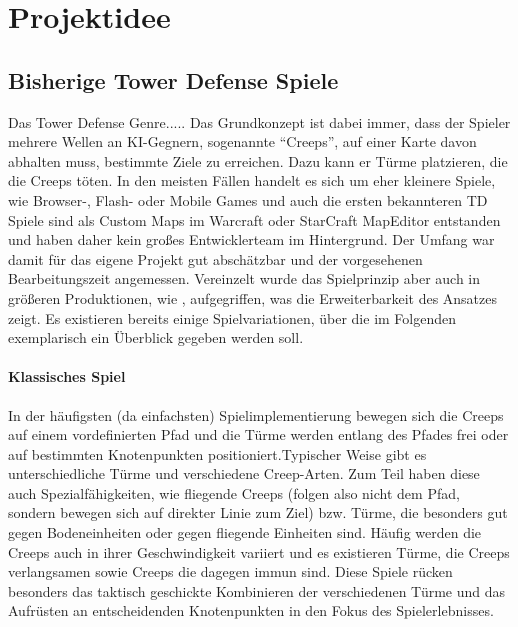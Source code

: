 \section{Projektidee} %
\label{sec:projektidee}


\subsection{Bisherige Tower Defense Spiele} %
\label{sub:bisherige_tower_defense_spiele}
Das Tower Defense Genre..... Das Grundkonzept ist dabei immer, dass der Spieler mehrere Wellen an KI-Gegnern, sogenannte \enquote{Creeps}, auf einer Karte davon abhalten muss, bestimmte Ziele zu erreichen. Dazu kann er Türme platzieren, die die Creeps töten. In den meisten Fällen handelt es sich um eher kleinere Spiele, wie Browser-, Flash- oder Mobile Games und auch die ersten bekannteren TD Spiele sind als Custom Maps im Warcraft oder StarCraft MapEditor entstanden und haben daher kein großes Entwicklerteam im Hintergrund. Der Umfang war damit für das eigene Projekt gut abschätzbar und der vorgesehenen Bearbeitungszeit angemessen. Vereinzelt wurde das Spielprinzip aber auch in größeren Produktionen, wie \todo{\dots}, aufgegriffen, was die Erweiterbarkeit des Ansatzes zeigt. Es existieren bereits einige Spielvariationen, über die im Folgenden exemplarisch ein Überblick gegeben werden soll.

\paragraph{Klassisches Spiel}
In der häufigsten (da einfachsten) Spielimplementierung bewegen sich die Creeps auf einem vordefinierten Pfad und die Türme werden entlang des Pfades frei oder auf bestimmten Knotenpunkten positioniert.Typischer Weise gibt es unterschiedliche Türme und verschiedene Creep-Arten. Zum Teil haben diese auch Spezialfähigkeiten, wie fliegende Creeps (folgen also nicht dem Pfad, sondern bewegen sich auf direkter Linie zum Ziel) bzw. Türme, die besonders gut gegen Bodeneinheiten oder gegen fliegende Einheiten sind. Häufig werden die Creeps auch in ihrer Geschwindigkeit variiert und es existieren Türme, die Creeps verlangsamen sowie Creeps die dagegen immun sind.  Diese Spiele rücken besonders das taktisch geschickte Kombinieren der verschiedenen Türme und das Aufrüsten an entscheidenden Knotenpunkten in den Fokus des Spielerlebnisses.


